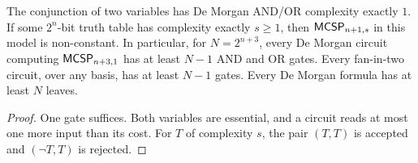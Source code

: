 \begin{theorem}
  \label{thm:lowerbounds-algebraic-mcsp-nonvacuity}
  \leanok
  The conjunction of two variables has De Morgan AND/OR complexity exactly
  $1$. If some $2^n$-bit truth table has complexity exactly $s \ge 1$, then
  $\mathsf{MCSP}_{n+1,s}$ in this model is non-constant. In particular, for
  $N = 2^{n+3}$, every De Morgan circuit computing $\mathsf{MCSP}_{n+3,1}$ has at
  least $N - 1$ AND and OR gates. Every fan-in-two circuit, over any basis,
  has at least $N - 1$ gates. Every De Morgan formula has at least $N$ leaves.
\end{theorem}
\begin{proof}
  \leanok
  One gate suffices. Both variables are essential, and a circuit reads at
  most one more input than its cost. For $T$ of complexity $s$, the pair
  $(T, T)$ is accepted and $(\lnot T, T)$ is rejected.
\end{proof}

